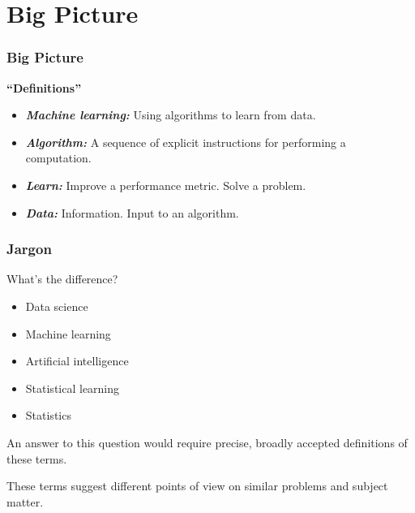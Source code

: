 \documentclass[xcolor={dvipsnames}]{beamer}
\begin{document}
\section{Big Picture}

\begin{frame}
    \frametitle{Big Picture}
    \setlength\parskip{1em}


    \textbf{``Definitions''}

    \begin{itemize}
        \setlength\parskip{1em}
        \item \textbf{\textit{Machine learning:}} Using algorithms to learn from data.
        
        \item \textbf{\textit{Algorithm:}} A sequence of explicit instructions for performing a computation.
        
        \item \textbf{\textit{Learn:}} Improve a performance metric. Solve a problem.
        
        \item \textbf{\textit{Data:}} Information. Input to an algorithm.
    \end{itemize}
\end{frame}

\begin{frame}
    \setlength\parskip{1em}
    \frametitle{Jargon}

    What's the difference?
    \begin{itemize}
        \item Data science
        \item Machine learning
        \item Artificial intelligence
        \item Statistical learning
        \item Statistics
    \end{itemize}

    An answer to this question would require precise, broadly accepted definitions of these terms.
    
    These terms suggest different points of view on similar problems and subject matter.
    
    

    

\end{frame}
\end{document}
